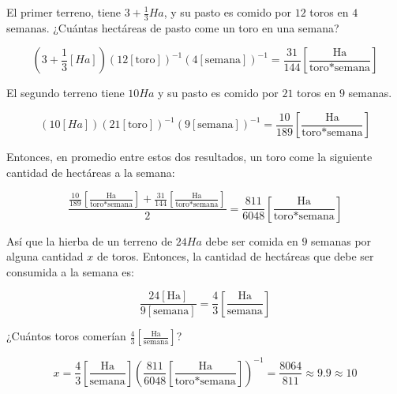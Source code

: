El primer terreno, tiene $3 + \frac{1}{3} Ha$, y su pasto es comido por $12$ toros en $4$ semanas. ¿Cuántas hectáreas de pasto come un toro en una semana?

\begin{equation*}
  (3 + \frac{1}{3} [Ha])(12 [\text{toro}])^{-1}(4 [\text{semana}])^{-1} = \frac{31}{144}[\frac{\text{Ha}}{\text{toro}*\text{semana}}]
\end{equation*}

El segundo terreno tiene $10 Ha$ y su pasto es comido por $21$ toros en $9$ semanas.

\begin{equation*}
  (10[Ha])(21 [\text{toro}])^{-1}(9 [\text{semana}])^{-1} = \frac{10}{189}[\frac{\text{Ha}}{\text{toro}*\text{semana}}]
\end{equation*}

Entonces, en promedio entre estos dos resultados, un toro come la siguiente cantidad de hectáreas a la semana:

\begin{equation*}
  \frac{\frac{10}{189}[\frac{\text{Ha}}{\text{toro}*\text{semana}}] + \frac{31}{144} [\frac{\text{Ha}}{\text{toro}*\text{semana}}]}{2} = \frac{811}{6048}[\frac{\text{Ha}}{\text{toro}*\text{semana}}]
\end{equation*}

Así que la hierba de un terreno de $24 Ha$ debe ser comida en $9$ semanas por alguna cantidad $x$ de toros. Entonces, la cantidad de hectáreas que debe ser consumida a la semana es:

\begin{equation*}
  \frac{24 [\text{Ha}]}{9 [\text{semana}]} = \frac{4}{3} [\frac{\text{Ha}}{\text{semana}}]
\end{equation*}

¿Cuántos toros comerían $\frac{4}{3}[\frac{\text{Ha}}{\text{semana}}]$?

\begin{equation*}
  x = \frac{4}{3} [\frac{\text{Ha}}{\text{semana}}] (\frac{811}{6048} [\frac{\text{Ha}}{\text{toro*semana}}])^{-1} = \frac{8064}{811} \approx 9.9 \approx 10
\end{equation*}
